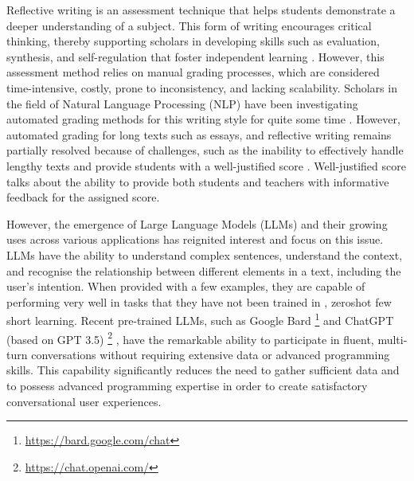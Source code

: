 \documentclass{article}
\begin{document}
Reflective writing \cite{gibson2017reflective} is an assessment technique that helps students demonstrate a deeper understanding of a subject. This form of writing encourages critical thinking, thereby supporting scholars in developing skills such as evaluation, synthesis, and self-regulation that foster independent learning \cite{azer2008use}. However, this assessment method relies on manual grading processes, which are considered time-intensive, costly, prone to inconsistency, and lacking scalability\cite{ullmann2017reflective}. Scholars in the field of Natural Language Processing (NLP) have been investigating automated grading methods for this writing style for quite some time \cite{beigman2017reflective}. However, automated grading for long texts such as essays, and reflective writing remains partially resolved because of challenges, such as the inability to effectively handle lengthy texts and provide students with a well-justified score \cite{ramesh2022automated}.  Well-justified score \cite{ramesh2022automated} talks about the ability to provide both students and teachers with informative feedback for the assigned score.

However, the emergence of Large Language Models (LLMs) \cite{strasser2023pitfalls} and their growing uses across various applications has reignited interest and focus on this issue. LLMs have the ability to understand complex sentences, understand the context, and recognise the relationship between different elements in a text, including the user's intention. When provided with a few examples, they are capable of performing very well in tasks that they have not been trained in \cite{zhang2022automatic}, zeroshot few short learning. Recent pre-trained LLMs, such as Google Bard \footnote{\url{https://bard.google.com/chat}} and ChatGPT (based on GPT 3.5) 
\footnote{\url{https://chat.openai.com/}} \cite{patil2023comparative}, have the remarkable ability to participate in fluent, multi-turn conversations without requiring extensive data or advanced programming skills. This capability significantly reduces the need to gather sufficient data and to possess advanced programming expertise in order to create satisfactory conversational user experiences\cite{logan2021cutting}. 
\end{document}
